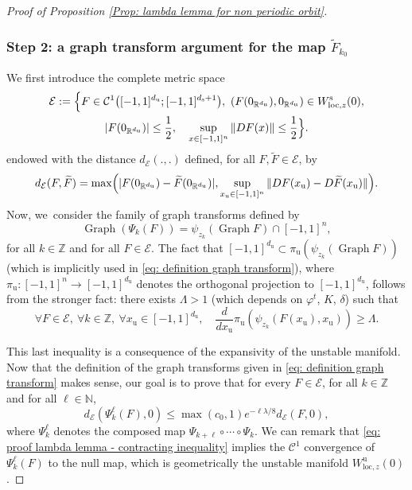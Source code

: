 \documentclass[JEP,XML,SOM,Unicode,NoEqCountersInSection,NoFloatCountersInSection,published]{cedram}
\newcommand{\loc}{\mathrm{loc}}
\newcommand{\rs}{\mathrm{s}}
\newcommand{\ru}{\mathrm{u}}
\theoremstyle{definition}
\theoremstyle{plain}
\newcommand{\Ccal}{\mathcal{C}}
\newcommand{\Ecal}{\mathcal{E}}
\newcommand{\N}{\mathbb{N}}
\newcommand{\R}{\mathbb{R}}
\newcommand{\Z}{\mathbb{Z}}
\DeclareMathOperator{\Graph}{Graph}
\begin{document}
\begin{appendix}
\begin{proof}[Proof of Proposition \ref{Prop: lambda lemma for non periodic orbit}]
\subsubsection*{Step 2: a graph transform argument for the map $\widetilde{F}_{k_0}$}
We first introduce the complete metric space
\begin{multline*}
\Ecal:= \Bigl\{ F \in \Ccal^{1} \bigl([-1,1]^{d_\ru}; [-1,1]^{d_\rs + 1} \bigr),\
\left(F(0_{\R^{d_\ru}}), 0_{\R^{d_\ru}} \right) \in W_{\loc,z}^\rs(0),\\
|F(0_{\R^{d_\ru}})| \leq \frac{1}{2}, \quad
\sup_{x \in [-1,1]^n} \|DF(x)\| \leq \frac{1}{2} \Bigr\}.
\end{multline*}
endowed with the distance $d_{\Ecal} (.,.)$ defined, for all $F, \widetilde{F} \in \Ecal$, by
\[
d_{\Ecal}(F, \widetilde{F}) = \max \Bigl(|F (0_{\R^{d_\ru}}) - \widetilde{F} (0_{\R^{d_\ru}})|, \sup_{x_\ru \in [-1,1]^n} \|DF (x_\ru) - D\widetilde{F} (x_\ru) \| \Bigr).
\]
Now, we~consider the family of graph transforms defined by
\begin{equation}\label{eq: definition graph transform}
\Graph \left(\Psi_k (F) \right) = \psi_{z_k} (\Graph F) \cap [-1, 1]^n,
\end{equation}
for all $ k \in \Z$ and for all $F \in \Ecal$. The fact that $[-1, 1]^{d_\ru} \subset \pi_\ru \left(\psi_{z_k} \left(\Graph F \right)\right)$ (which is implicitly used in \eqref{eq: definition graph transform}), where $\pi_\ru: [-1,1]^n \to [-1,1]^{d_\ru}$ denotes the orthogonal projection to $[-1,1]^{d_\ru}$, follows from the stronger fact: there exists $\Lambda > 1$ (which depends on $\varphi^t$, $K$, $\delta$) such that
\begin{equation}\label{eq: expansivity in the unstable direction}
\forall F \in \Ecal, \: \forall k \in \Z, \: \forall x_\ru \in [- 1, 1]^{d_\ru}, \quad \frac{d}{d x_\ru} \pi_\ru \left(\psi_{z_k} \left(F(x_\ru), x_\ru \right) \right) \geq \Lambda.
\end{equation}

This last inequality is a consequence of the expansivity of the unstable manifold. Now that the definition of the graph transforms given in \eqref{eq: definition graph transform} makes sense, our goal is to prove that for every $F \in \Ecal$, for all $k \in \Z$ and for all $\ell \in \N$,
\begin{equation}\label{eq: proof lambda lemma - contracting inequality}
d_{\Ecal} \left(\Psi_k^{\ell}(F), 0 \right) \leq \max (c_0, 1) e^{-\ell \lambda / 8} d_{\Ecal} \left(F, 0 \right),
\end{equation}
where $\Psi_k^{\ell}$ denotes the composed map $\Psi_{k + \ell} \circ \cdots \circ \Psi_{k}$.
We can remark that \eqref{eq: proof lambda lemma - contracting inequality} implies the $\Ccal^1$ convergence of $\Psi_k^{\ell}(F)$ to the null map, which is geometrically the unstable manifold $W_{\loc, z}^\ru (0)$.


\end{proof}
\end{appendix}
\end{document}
